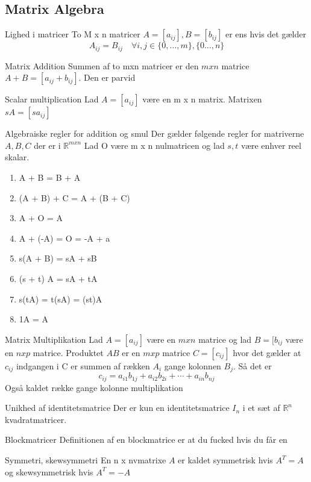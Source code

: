 \documentclass[a4paper,fleqn]{article}
\newcommand{\RR}{\mathbb{R}}
\begin{document}
	\subsection{Matrix Algebra}
	\begin{definition}{Lighed i matricer}{}
		To M x n matricer $A = [a_{ij}], B = [b_{ij}]$ er ens hvis det gælder
		\[ A_{ij} = B_{ij} \quad\forall i,j \in \{ 0, \dots, m\}, \{ 0 \dots, n\} \]
	\end{definition}
	\begin{definition}{Matrix Addition}
		Summen af to mxn matricer er den $m x n$ matrice $A + B = [a_{ij} + b_{ij}]$. Den
		er parvid
	\end{definition}
	\begin{definition}{Scalar multiplication}{}
		Lad $A = [a_{ij}]$ være en m x n matrix. Matrixen $sA = [sa_{ij}]$
	\end{definition}
	\begin{theorem}{Algebraiske regler for addition og smul}{}
		Der gælder følgende regler for matriverne $A,B,C$ der er i $\RR^{mxn}$ Lad O
		være m x n nulmatricen og lad $s,t$ være enhver reel skalar.
		\begin{enumerate}
			\item A + B = B + A
			\item (A + B) + C = A + (B + C)
			\item A + O = A
			\item A + (-A) = O = -A + a
			\item s(A + B) = sA + sB
			\item (s + t) A = sA + tA
			\item s(tA) = t(sA) = (st)A
			\item 1A = A
		\end{enumerate}
	\end{theorem}
	\begin{definition}{Matrix Multiplikation}{}
		Lad $A = [a_{ij}]$ være en $m x n$ matrice og lad $B = [b_{ij}$ være en $n x p$
		matrice. Produktet $AB$ er en $m x p$ matrice $C = [c_{ij}]$ hvor det gælder at
		$c_{ij}$ indgangen i C er summen af rækken $A_i$ gange kolonnen $B_j$. Så det er
		\[ c_{ij} = a_{i1}b_{1j} + a_{i2}b_{2i} + \cdots + a_{in} b_{nj} \]
		Også kaldet række gange kolonne multiplikation
	\end{definition}
	\begin{theorem}{Unikhed af identitetsmatrice}{}
		Der er kun en identitetsmatrice $I_n$ i et sæt af $\RR^n$ kvadratmatricer.
	\end{theorem}
	\begin{definition}{Blockmatricer}{}
		Definitionen af en blockmatrice er at du fucked hvis du får en
	\end{definition}
	\begin{definition}{Symmetri, skewsymmetri}{}
		En n x nvmatrixe $A$ er kaldet symmetrisk hvis $A^T = A$ og skewsymmetrisk hvis
		$A^T = -A$
	\end{definition}
\end{document}
